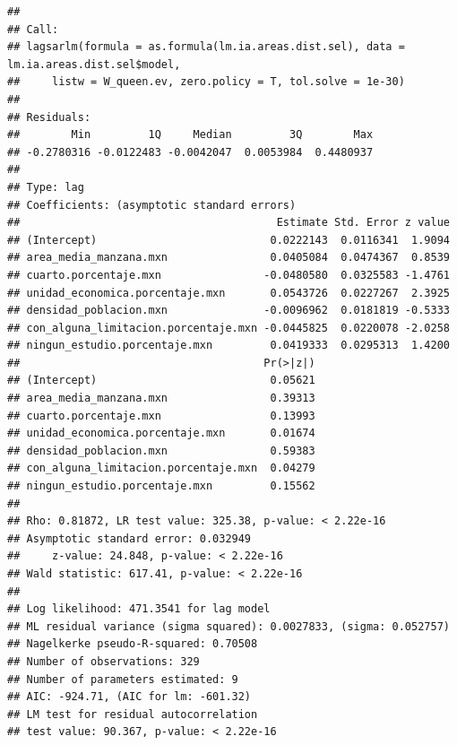 \documentclass[12pt,]{book}
\newenvironment{Shaded}{\begin{snugshade}}{\end{snugshade}}
\newcommand{\KeywordTok}[1]{\textcolor[rgb]{0.13,0.29,0.53}{\textbf{#1}}}
\newcommand{\DataTypeTok}[1]{\textcolor[rgb]{0.13,0.29,0.53}{#1}}
\newcommand{\FloatTok}[1]{\textcolor[rgb]{0.00,0.00,0.81}{#1}}
\newcommand{\StringTok}[1]{\textcolor[rgb]{0.31,0.60,0.02}{#1}}
\newcommand{\CommentTok}[1]{\textcolor[rgb]{0.56,0.35,0.01}{\textit{#1}}}
\newcommand{\OperatorTok}[1]{\textcolor[rgb]{0.81,0.36,0.00}{\textbf{#1}}}
\newcommand{\NormalTok}[1]{#1}
\begin{document}
\begin{verbatim}
## 
## Call:
## lagsarlm(formula = as.formula(lm.ia.areas.dist.sel), data = lm.ia.areas.dist.sel$model, 
##     listw = W_queen.ev, zero.policy = T, tol.solve = 1e-30)
## 
## Residuals:
##        Min         1Q     Median         3Q        Max 
## -0.2780316 -0.0122483 -0.0042047  0.0053984  0.4480937 
## 
## Type: lag 
## Coefficients: (asymptotic standard errors) 
##                                        Estimate Std. Error z value
## (Intercept)                           0.0222143  0.0116341  1.9094
## area_media_manzana.mxn                0.0405084  0.0474367  0.8539
## cuarto.porcentaje.mxn                -0.0480580  0.0325583 -1.4761
## unidad_economica.porcentaje.mxn       0.0543726  0.0227267  2.3925
## densidad_poblacion.mxn               -0.0096962  0.0181819 -0.5333
## con_alguna_limitacion.porcentaje.mxn -0.0445825  0.0220078 -2.0258
## ningun_estudio.porcentaje.mxn         0.0419333  0.0295313  1.4200
##                                      Pr(>|z|)
## (Intercept)                           0.05621
## area_media_manzana.mxn                0.39313
## cuarto.porcentaje.mxn                 0.13993
## unidad_economica.porcentaje.mxn       0.01674
## densidad_poblacion.mxn                0.59383
## con_alguna_limitacion.porcentaje.mxn  0.04279
## ningun_estudio.porcentaje.mxn         0.15562
## 
## Rho: 0.81872, LR test value: 325.38, p-value: < 2.22e-16
## Asymptotic standard error: 0.032949
##     z-value: 24.848, p-value: < 2.22e-16
## Wald statistic: 617.41, p-value: < 2.22e-16
## 
## Log likelihood: 471.3541 for lag model
## ML residual variance (sigma squared): 0.0027833, (sigma: 0.052757)
## Nagelkerke pseudo-R-squared: 0.70508 
## Number of observations: 329 
## Number of parameters estimated: 9 
## AIC: -924.71, (AIC for lm: -601.32)
## LM test for residual autocorrelation
## test value: 90.367, p-value: < 2.22e-16
\end{verbatim}

\begin{Shaded}
\end{Shaded}
\end{document}
